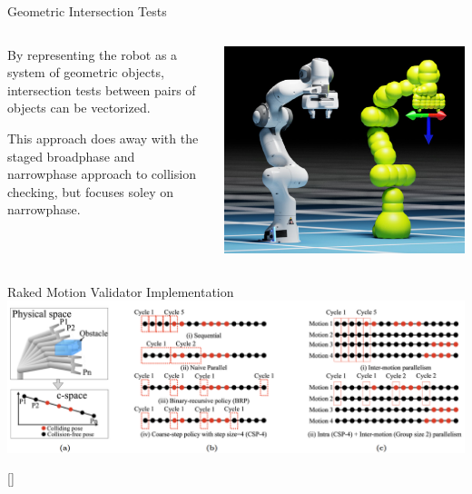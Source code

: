 \documentclass{beamer}
\begin{document}
\begin{frame}{Geometric Intersection Tests}
\begin{columns}
\begin{column}{0.5\textwidth}
By representing the robot as a system of geometric objects, intersection tests between pairs of objects can be vectorized.

\vspace{10px}

This approach does away with the staged broadphase and narrowphase approach to collision checking, but focuses soley on narrowphase.
\end{column}
\begin{column}{0.5\textwidth}
\includegraphics[width=\textwidth]{./assets/panda_spheres.png}
\end{column}
\end{columns}
\end{frame}

\begin{frame}{Raked Motion Validator Implementation}
\includegraphics[width=\textwidth]{./assets/eemp_mv.png}

[\cite{paper:eemp}]
\end{frame}
\end{document}
